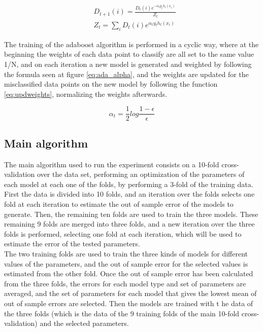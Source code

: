 \documentclass[10pt, journal]{IEEEtran}
\begin{document}
\begin{equation}
	\begin{aligned}
	&D_{t+1}(i) = \frac{D_t(i)e^{-\alpha_ty_th_t(x_i)}}{Z_t}\\
	&Z_t = \sum_{i}{D_t(i)e^{\alpha_ty_th_t(x_i)}}
	\end{aligned}
	\label{eq:updweights}
\end{equation}

The training of the adaboost algorithm is performed in a cyclic way, where at the beginning the weights of each data point to classify are all set to the same value 1/N, and on each iteration a new model is generated and weighted by following the formula seen at figure \ref{eq:ada_alpha}, and the weights are updated for the misclassified data points on the new model by following the function \ref{eq:updweights}, normalizing the weights afterwards.

\begin{equation}
	\alpha_t = \frac{1}{2}log\frac{1-\epsilon}{\epsilon}
	\label{eq:ada_alpha}
\end{equation}


\subsection{Main algorithm} %
\label{sub:main_algorithm}
The main algorithm used to run the experiment consists on a 10-fold cross-validation over the data set, performing an optimization of the parameters of each model at each one of the folds, by performing a 3-fold of the training data.\\

First the data is divided into 10 folds, and an iteration over the folds selects one fold at each iteration to estimate the out of sample error of the models to generate. Then, the remaining ten folds are used to train the three models. These remaining 9 folds are merged into three folds, and a new iteration over the three folds is performed, selecting one fold at each iteration, which will be used to estimate the error of the tested parameters.\\

The two training folds are used to train the three kinds of models for different values of the parameters, and the out of sample error for the selected values is estimated from the other fold. Once the out of sample error has been calculated from the three folds, the errors for each model type and set of parameters are averaged, and the set of parameters for each model that gives the lowest mean of out of sample errors are selected. Then the models are trained with t	he data of the three folds (which is the data of the 9 training folds of the main 10-fold cross-validation) and the selected parameters.\\
\end{document}
